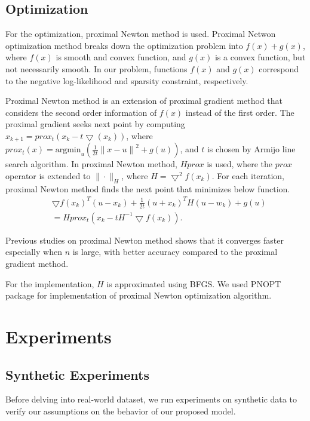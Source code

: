 \documentclass{article}
\begin{document}
\subsection{Optimization}
For the optimization, proximal Newton method \cite{schmidt2010graphical,schmidt2011projected} is used. Proximal Netwon optimization method breaks down the optimization problem into $f(x) + g(x)$, where $f(x)$ is smooth and convex function, and $g(x)$ is a convex function, but not necessarily smooth. 
In our problem, functions $f(x)$ and $g(x)$ correspond to the negative log-likelihood and sparsity constraint, respectively.

Proximal Newton method is an extension of proximal gradient method that considers the second order information of $f(x)$ instead of the first order.
The proximal gradient seeks next point by computing $x_{k+1} = prox_t (x_k - t \bigtriangledown(x_k))$, where $prox_t(x)=\text{argmin}_u(\frac{1}{2t}{\|x-u\|}^2 + g(u))$, and $t$ is chosen by Armijo line search algorithm. In proximal Newton method, $Hprox$ is used, where the $prox$ operator is extended to $\| \cdot \|_H$, where $H=\bigtriangledown^2 f(x_k)$. For each iteration, proximal Newton method finds the next point that minimizes below function.
\begin{align}
  &\bigtriangledown f(x_k)^T(u-x_k)+\frac{1}{2t}(u+x_k)^TH(u-w_k)+g(u) \nonumber    \\
 & =  Hprox_t(x_k-tH^{-1}\bigtriangledown f(x_k)).
\end{align}

Previous studies on proximal Newton method \cite{lee2012proximal} shows that it converges faster especially when $n$ is large, with better accuracy compared to the proximal gradient method.

For the implementation, $H$ is approximated using BFGS.
We used PNOPT package \cite{lee2012proximal} for implementation of proximal Newton optimization algorithm.



\section{Experiments}


\subsection{Synthetic Experiments}
Before delving into real-world dataset, we run experiments on synthetic data to verify our assumptions on the behavior of our proposed model.
\end{document}
